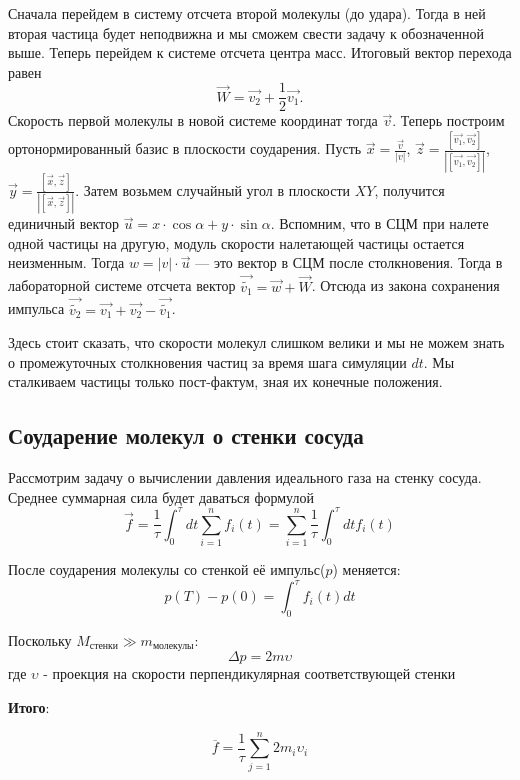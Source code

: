\documentclass[twoside,twocolumn, 11pt]{article}
\theoremstyle{plain}
\theoremstyle{definition}
\begin{document}
Сначала перейдем в систему отсчета второй молекулы (до удара). Тогда в ней вторая частица будет неподвижна и мы сможем свести задачу к обозначенной выше. Теперь перейдем к системе отсчета центра масс. Итоговый вектор перехода равен
\begin{equation}
\vec{W} = \vec{v_2} + \frac{1}{2}\vec{v_1}.
\end{equation}
\indent Скорость первой молекулы в новой системе координат тогда $\vec{v}$.
Теперь построим ортонормированный базис в плоскости соударения. Пусть $\vec{x} = \frac{\vec{v}}{|v|}$, $\vec{z} = \frac{[\vec{v_1}, \vec{v_2}]}{|[\vec{v_1}, \vec{v_2}]|}$, $\vec{y} = \frac{[\vec{x}, \vec{z}]}{|[\vec{x}, \vec{z}]|}$. Затем возьмем случайный угол в плоскости $XY$, получится единичный вектор $\vec{u} = x \cdot \cos \alpha + y \cdot \sin \alpha$. Вспомним, что в СЦМ при налете одной частицы на другую, модуль скорости налетающей частицы остается неизменным. Тогда $w = |v| \cdot \vec{u}$ — это вектор в СЦМ после столкновения. Тогда в лабораторной системе отсчета вектор $\vec{\widetilde{v_1}} = \vec{w} + \vec{W}$. Отсюда из закона сохранения импульса $\vec{\widetilde{v_2}} = \vec{v_1} + \vec{v_2} - \vec{\widetilde{v_1}}$.

Здесь стоит сказать, что скорости молекул слишком велики и мы не можем знать о промежуточных столкновения частиц за время шага симуляции $dt$. Мы сталкиваем частицы только пост-фактум, зная их конечные положения.
\subsection{Соударение молекул о стенки сосуда}
Рассмотрим задачу о вычислении давления идеального газа на стенку сосуда. Среднее суммарная сила будет даваться формулой
\begin{equation}
\vec{f} = \dfrac{1}{\tau} \int_0^\tau dt \sum_{i=1}^n f_i(t) = \sum_{i=1}^n \dfrac{1}{\tau} \int_0^\tau dt f_i(t)
\end{equation}

После соударения молекулы со стенкой её импульс($p$) меняется:
\[p(T) - p(0) = \int_0^\tau f_i(t) dt \]

Поскольку $M_\text{стенки} \gg m_\text{молекулы}$:
\[\Delta p = 2m\upsilon \]где $\upsilon$ - проекция на скорости перпендикулярная соответствующей стенки

\textbf{Итого}:

\begin{equation}
\overline{f} = \dfrac{1}{\tau} \sum_{j=1}^n 2 m_i \upsilon_i
\end{equation}
\end{document}
